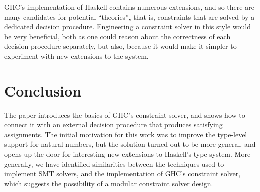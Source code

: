 \documentclass{sigplanconf}
\begin{document}
GHC's implementation of Haskell contains numerous extensions, and so
there are many candidates for potential ``theories'', that is, constraints
that are solved by a dedicated decision procedure.  Engineering a
constraint solver in this style would be very beneficial, both
as one could reason about the correctness of each decision procedure
separately, but also, because it would make it simpler to experiment
with new extensions to the system.

\section {Conclusion}

The paper introduces the basics of GHC's constraint solver, and shows
how to connect it with an external decision procedure that produces
satisfying assignments.  The initial motivation for this work was
to improve the type-level support for natural numbers, but the solution
turned out to be more general, and opens up the door for interesting
new extensions to Haskell's type system.  More generally, we have
identified similarities between the techniques used to implement SMT solvers,
and the implementation of GHC's constraint solver, which suggests
the possibility of a modular constraint solver design.





% 
% 

\end{document}
